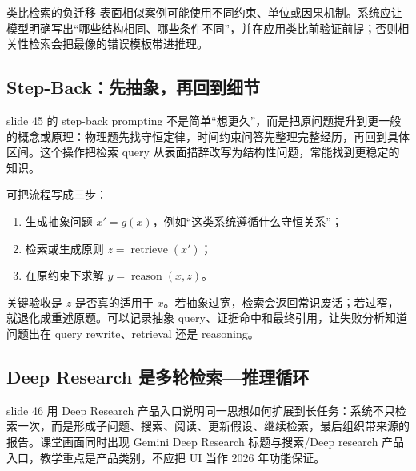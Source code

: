 

\begin{warningbox}{类比检索的负迁移}
表面相似案例可能使用不同约束、单位或因果机制。系统应让模型明确写出“哪些结构相同、哪些条件不同”，并在应用类比前验证前提；否则相关性检索会把最像的错误模板带进推理。
\end{warningbox}

\subsection{Step-Back：先抽象，再回到细节}

slide 45 的 step-back prompting 不是简单“想更久”，而是把原问题提升到更一般的概念或原理：物理题先找守恒定律，时间约束问答先整理完整经历，再回到具体区间。这个操作把检索 query 从表面措辞改写为结构性问题，常能找到更稳定的知识。


可把流程写成三步：
\begin{enumerate}
  \item 生成抽象问题 $x' = g(x)$，例如“这类系统遵循什么守恒关系”；
  \item 检索或生成原则 $z=\operatorname{retrieve}(x')$；
  \item 在原约束下求解 $y=\operatorname{reason}(x,z)$。
\end{enumerate}
关键验收是 $z$ 是否真的适用于 $x$。若抽象过宽，检索会返回常识废话；若过窄，就退化成重述原题。可以记录抽象 query、证据命中和最终引用，让失败分析知道问题出在 query rewrite、retrieval 还是 reasoning。

\subsection{Deep Research 是多轮检索—推理循环}

slide 46 用 Deep Research 产品入口说明同一思想如何扩展到长任务：系统不只检索一次，而是形成子问题、搜索、阅读、更新假设、继续检索，最后组织带来源的报告。课堂画面同时出现 Gemini Deep Research 标题与搜索/Deep research 产品入口，教学重点是产品类别，不应把 UI 当作 2026 年功能保证。


